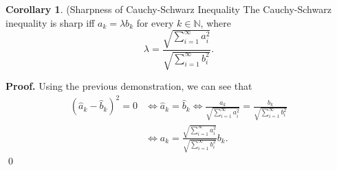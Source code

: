 \documentclass[11pt]{article}
\theoremstyle{definition}
\newenvironment{prf}[1][Proof]{\textbf{#1.} }{\qed}
\newtheorem{corollary}{Corollary}[section]
\begin{document}
\begin{corollary}{(Sharpness of Cauchy-Schwarz Inequality}
    The Cauchy-Schwarz inequality is sharp iff
    $a_k = \lambda b_k$ for every $k \in \mathbb N$, where
    \begin{equation}
        \lambda = \frac{\sqrt{\sum^\infty_{i=1}a_i ^2}}
        {\sqrt{\sum^\infty_{i=1}b_i ^2}}.
    \end{equation}
\end{corollary}
\begin{shaded}
\begin{prf}
    Using the previous demonstration, we can see that
    \begin{align*}
        (\hat a_k - \hat b_k)^2 = 0 &\iff \hat a_k = \hat b_k \iff
        \frac{a_k}{\sqrt{\sum^\infty_{i=1} a_i^2}}=
        \frac{b_k}{\sqrt{\sum^\infty_{i=1} b_i^2}}\\
        &\iff
        a_k = \frac{\sqrt{\sum^\infty_{i=1}a_i^2}}
        {\sqrt{\sum^\infty_{i=1}b_i^2}} b_k.
    \end{align*}
\end{prf}
\end{shaded}
\end{document}

